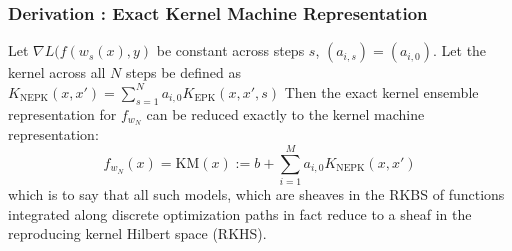 \begin{frame}
  \frametitle{Derivation : Exact Kernel Machine Representation}
\begin{theorem}
\label{thm:ekr}
Let $\nabla L(f(w_{s}(x), y)$ be constant  across steps $s$, $(a_{i,s}) = (a_{i,0})$. Let the kernel across all $N$ steps be defined as $K_{\text{NEPK}}(x,x') = \sum_{s = 1}^N a_{i,0} K_{\text{EPK}}(x, x', s)$ Then the exact kernel ensemble representation for $f_{w_N}$ can be reduced exactly to the kernel machine representation:
\begin{equation}
f_{w_N}(x) = \text{KM}(x) := b + \sum_{i = 1}^{M} a_{i,0} K_{\text{NEPK}}(x,x')
\label{exact}
\end{equation}
which is to say that all such models, which are sheaves in the RKBS of
functions integrated along discrete optimization paths in fact reduce
to a sheaf in the reproducing kernel Hilbert space (RKHS). 
\end{theorem}
\end{frame}




